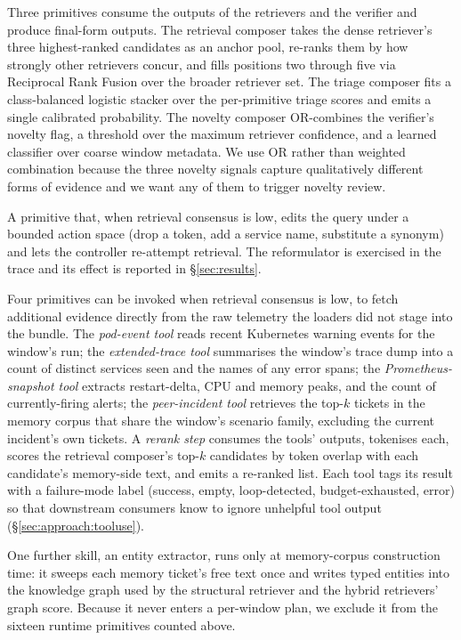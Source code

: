  Three primitives consume the outputs of the retrievers and the verifier and produce final-form outputs. The retrieval composer takes the dense retriever's three highest-ranked candidates as an anchor pool, re-ranks them by how strongly other retrievers concur, and fills positions two through five via Reciprocal Rank Fusion over the broader retriever set. The triage composer fits a class-balanced logistic stacker over the per-primitive triage scores and emits a single calibrated probability. The novelty composer OR-combines the verifier's novelty flag, a threshold over the maximum retriever confidence, and a learned classifier over coarse window metadata. We use OR rather than weighted combination because the three novelty signals capture qualitatively different forms of evidence and we want any of them to trigger novelty review.

 A primitive that, when retrieval consensus is low, edits the query under a bounded action space (drop a token, add a service name, substitute a synonym) and lets the controller re-attempt retrieval. The reformulator is exercised in the trace and its effect is reported in \S\ref{sec:results}.

 Four primitives can be invoked when retrieval consensus is low, to fetch additional evidence directly from the raw telemetry the loaders did not stage into the bundle. The \emph{pod-event tool} reads recent Kubernetes warning events for the window's run; the \emph{extended-trace tool} summarises the window's trace dump into a count of distinct services seen and the names of any error spans; the \emph{Prometheus-snapshot tool} extracts restart-delta, CPU and memory peaks, and the count of currently-firing alerts; the \emph{peer-incident tool} retrieves the top-$k$ tickets in the memory corpus that share the window's scenario family, excluding the current incident's own tickets. A \emph{rerank step} consumes the tools' outputs, tokenises each, scores the retrieval composer's top-$k$ candidates by token overlap with each candidate's memory-side text, and emits a re-ranked list. Each tool tags its result with a failure-mode label (success, empty, loop-detected, budget-exhausted, error) so that downstream consumers know to ignore unhelpful tool output (\S\ref{sec:approach:tooluse}).

 One further skill, an entity extractor, runs only at memory-corpus construction time: it sweeps each memory ticket's free text once and writes typed entities into the knowledge graph used by the structural retriever and the hybrid retrievers' graph score. Because it never enters a per-window plan, we exclude it from the sixteen runtime primitives counted above.

